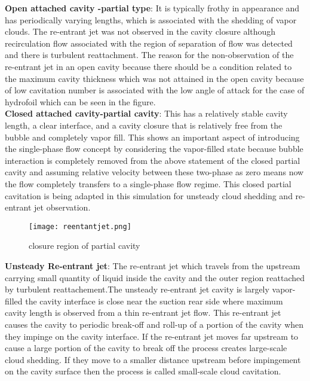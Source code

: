 \textbf{Open attached cavity -partial type}: It is typically frothy in appearance and has periodically varying lengths, which is associated with the shedding of vapor clouds. The re-entrant jet was not observed 
in the cavity closure although recirculation flow associated with the region of separation of flow was detected and there is turbulent reattachment. The reason for the non-observation of the re-entrant jet in an open cavity
because there should be a condition related to the maximum cavity thickness which was not attained in the open cavity because of low cavitation number is associated with the low angle of attack for the case of hydrofoil
which can be seen in the figure.\\
\textbf{Closed attached cavity-partial cavity}: This has a relatively stable cavity length, a clear interface, and a cavity closure that is relatively free from the bubble and completely vapor fill. This 
shows an important aspect of introducing the single-phase flow concept by considering the vapor-filled state because bubble interaction is completely removed from the above statement of the closed partial cavity 
and assuming relative velocity between these two-phase as zero means now the flow completely transfers to a single-phase flow regime. This closed partial cavitation is being adapted in this simulation for 
unsteady cloud shedding and re-entrant jet observation.\\
\begin{figure}[H]
 \centering
 \texttt{[image: reentantjet.png]}
 \caption{closure region of partial cavity}
  \label{fig:fig11}
\end{figure}
 \textbf{Unsteady Re-entrant jet}: The re-entrant jet which travels from the upstream carrying small quantity of liquid inside the cavity and the outer region reattached by turbulent reattachement.The unsteady 
 re-entrant jet cavity is largely vapor-filled the cavity interface is close near the suction rear side where maximum cavity length is observed
from a thin re-entrant jet flow. This re-entrant jet causes the cavity to periodic break-off and roll-up of a portion of the cavity when they impinge on the cavity interface. If the re-entrant jet moves far upstream to cause a large portion of the cavity to 
break off the process creates large-scale cloud shedding. If they move to a smaller distance upstream before impingement on the cavity surface then the process is called small-scale cloud cavitation.

